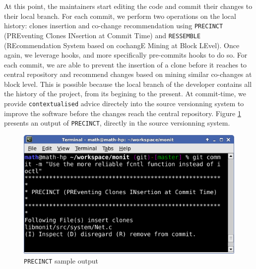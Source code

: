 At this point, the maintainers start editing the code and commit their changes to their local branch.
For each commit, we perform two operations on the local history: clones insertion and co-change recommendation using {\tt PRECINCT} (PREventing Clones INsertion at Commit Time) and {\tt RESSEMBLE} (REcommendation System based on cochangE Mining at Block LEvel).
Once again, we leverage hooks, and more specifically pre-commits hooks to do so.
For each commit, we are able to prevent the insertion of a clone before it reaches to central repository and recommend changes based on mining similar co-changes at block level.
This is possible because the local branch of the developer contains all the history of the project, from its begining to the present.
At commit-time, we provide {\tt contextualised} advice directely into the source versionning system to improve the software before the changes reach the central repository.
Figure \ref{fig:precinct-intro} presents an output of {\tt PRECINCT}, directly in the source versionning system.

\begin{figure}[h!]
	\centering
	\includegraphics[scale=0.7]{media/commit.png}
	\caption{{\tt PRECINCT} sample output}
	\label{fig:precinct-intro}
\end{figure}

